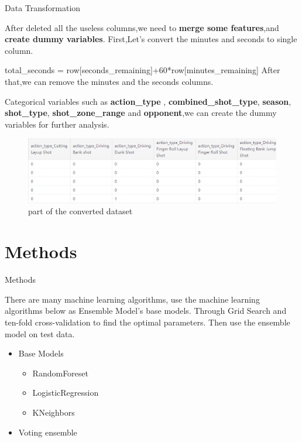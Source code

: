 \documentclass[
size=14pt,
paper=smartboard,  %
mode=present, 		%
display=slides, 	%
pauseslide,
fleqn,leqno]{powerdot}
\begin{document}
\begin{slide}{Data Transformation}

After deleted all the useless columns,we need to \textbf{merge some features},and \textbf{create dummy variables}.\quad
First,Let's convert the minutes and seconds to single column.
\begin{description}
\item total\_seconds = row[seconds\_remaining]+60*row[minutes\_remaining] 
	\newline
After that,we can remove the minutes and the seconds columns.
\end{description}

\item Categorical variables such as \textbf{action_type} , \textbf{combined_shot_type}, \textbf{season}, \textbf{shot_type}, \textbf{shot_zone_range} 
and \textbf{opponent},we can create the dummy variables for further analysis.
\begin{figure}[htbp]
	\centering
	\includegraphics[scale=0.6]{u.eps
	}        %
	\caption{part of the converted dataset}
\end{figure}
\end{slide}


\section{Methods}


\begin{slide}[toc=,bm=]{Methods}

There are many machine learning algorithms, 
use the machine learning algorithms below
as Ensemble Model’s base models. 
Through Grid Search and
ten-fold cross-validation
to find the optimal parameters.
Then use the ensemble model on
test data.

\begin{center}
	\begin{itemize}
		\item Base Models
		\
		\begin{itemize}
			\item RandomForeset
			\item LogisticRegression	
			\item KNeighbors
		\end{itemize}
	   \item Voting ensemble
	\end{itemize}
\end{center}

\end{slide}
\end{document}
